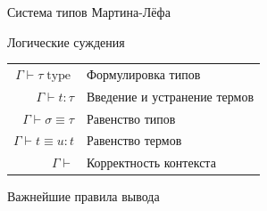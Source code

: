 \documentclass{beamer}
\DeclareMathOperator{\elim}{elim}
\DeclareMathOperator{\type}{type}
\begin{document}
\begin{frame}{Система типов Мартина-Лёфа}
  \begin{block}{Логические суждения}
  \begin{center}
  \begin{tabular}{rl}
    $\Gamma \vdash \tau \type$ & Формулировка типов \\
    $\Gamma \vdash t : \tau$ & Введение и устранение термов \\
    $\Gamma \vdash \sigma \equiv \tau$ & Равенство типов \\
    $\Gamma \vdash t \equiv u : t$ & Равенство термов \\
    $\Gamma \vdash$ & Корректность контекста
  \end{tabular}
  \end{center}
  \end{block}
  \begin{block}{Важнейшие правила вывода}
  \end{block}
\end{frame}
\end{document}
